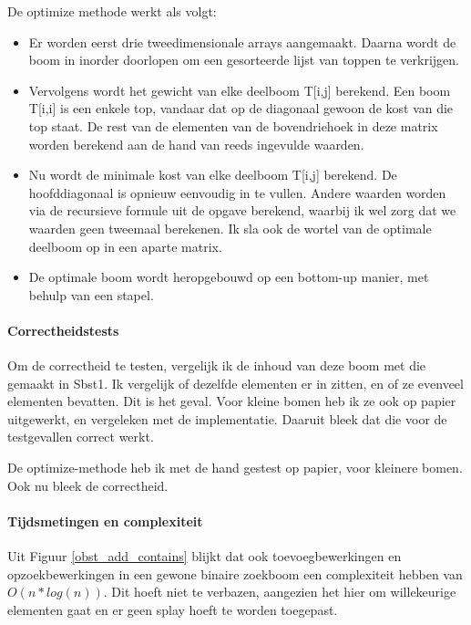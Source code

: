 \documentclass[titlepage,a4paper]{article}
\begin{document}
De optimize methode werkt als volgt:

\begin{itemize}
\item Er worden eerst drie tweedimensionale arrays aangemaakt. Daarna wordt de boom in inorder doorlopen om een gesorteerde lijst van toppen te verkrijgen.

\item Vervolgens wordt het gewicht van elke deelboom T[i,j] berekend. Een boom T[i,i] is een enkele top, vandaar dat op de diagonaal gewoon de kost van die top staat. De rest van de elementen van de bovendriehoek in deze matrix worden berekend aan de hand van reeds ingevulde waarden.

\item Nu wordt de minimale kost van elke deelboom T[i,j] berekend. De hoofddiagonaal is opnieuw eenvoudig in te vullen. Andere waarden worden via de recursieve formule uit de opgave berekend, waarbij ik wel zorg dat we waarden geen tweemaal berekenen. Ik sla ook de wortel van de optimale deelboom op in een aparte matrix.

\item De optimale boom wordt heropgebouwd op een bottom-up manier, met behulp van een stapel.
\end{itemize}

\paragraph{Correctheidstests}
Om de correctheid te testen, vergelijk ik de inhoud van deze boom met die gemaakt in Sbst1. Ik vergelijk of dezelfde elementen er in zitten, en of ze evenveel elementen bevatten. Dit is het geval. Voor kleine bomen heb ik ze ook op papier uitgewerkt, en vergeleken met de implementatie. Daaruit bleek dat die voor de testgevallen correct werkt.

De optimize-methode heb ik met de hand gestest op papier, voor kleinere bomen. Ook nu bleek de correctheid.

\paragraph{Tijdsmetingen en complexiteit}
Uit Figuur \ref{obst_add_contains} blijkt dat ook toevoegbewerkingen en opzoekbewerkingen in een gewone binaire zoekboom een complexiteit hebben van $O(n*log(n))$. Dit hoeft niet te verbazen, aangezien het hier om willekeurige elementen gaat en er geen splay hoeft te worden toegepast.
\end{document}
